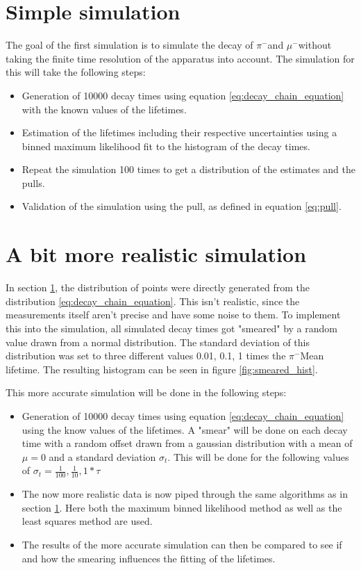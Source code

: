 \documentclass[11pt, a4paper, oneside]{book}
\newcommand{\pion}{$\pi^{-}$}
\newcommand{\muon}{$\mu^{-}$}
\begin{document}
\section{Simple simulation} \label{sec:simple_simulation}
The goal of the first simulation is to simulate the decay of \pion and \muon without taking the finite time resolution of the apparatus into account. The simulation for this will take the following steps:
\begin{itemize}
  \item Generation of \num{10000} decay times using equation \ref{eq:decay_chain_equation} with the known    values of the lifetimes.
  \item Estimation of the lifetimes including their respective uncertainties using a binned maximum likelihood fit to the histogram of the decay times.
  \item Repeat the simulation \num{100} times to get a distribution of the estimates and the pulls.
  \item Validation of the simulation using the pull, as defined in equation \ref{eq:pull}.
\end{itemize}

\section{A bit more realistic simulation} \label{sec:realistic_simulation}
In section \ref{sec:simple_simulation}, the distribution of points were directly generated from the distribution \ref{eq:decay_chain_equation}. This isn't realistic, since the measurements itself aren't precise and have some noise to them. To implement this into the simulation, all simulated decay times got "smeared" by a random value drawn from a normal distribution. The standard deviation of this distribution was set to three different values 0.01, 0.1, 1 times the \pion Mean lifetime. The resulting histogram can be seen in figure \ref{fig:smeared_hist}.

This more accurate simulation will be done in the following steps:
\begin{itemize}
  \item Generation of \num{10000} decay times using equation \ref{eq:decay_chain_equation} using the know values of the lifetimes. A "smear" will be done on each decay time with a random offset drawn from a gaussian distribution with a mean of $\mu = 0$ and a standard deviation $\sigma_t$. This will be done for the following values of $\sigma_t = \frac{1}{100}, \frac{1}{10}, 1 * \tau$
  \item The now more realistic data is now piped through the same algorithms as in section \ref{sec:simple_simulation}. Here both the maximum binned likelihood method as well as the least squares method are used.
  \item The results of the more accurate simulation can then be compared to see if and how the smearing influences the fitting of the lifetimes.
\end{itemize}
\end{document}
